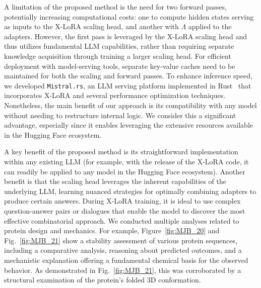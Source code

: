 A limitation of the proposed method is the need for two forward passes, potentially increasing computational costs: one to compute hidden states serving as inputs to the X-LoRA scaling head, and another with $\Lambda$ applied to the adapters. However, the first pass is leveraged by the X-LoRA scaling head and thus utilizes fundamental LLM capabilities, rather than requiring separate knowledge acquisition through training a larger scaling head. For efficient deployment with model-serving tools, separate key-value caches need to be maintained for both the scaling and forward passes. To enhance inference speed, we developed \texttt{Mistral.rs}, an LLM serving platform implemented in Rust~\cite{matsakis2014rust} that incorporates X-LoRA and several performance optimization techniques. Nonetheless, the main benefit of our approach is its compatibility with any model without needing to restructure internal logic. We consider this a significant advantage, especially since it enables leveraging the extensive resources available in the Hugging Face ecosystem.

A key benefit of the proposed method is its straightforward implementation within any existing LLM (for example, with the release of the X-LoRA code, it can readily be applied to any model in the Hugging Face ecosystem). Another benefit is that the scaling head leverages the inherent capabilities of the underlying LLM, learning nuanced strategies for optimally combining adapters to produce certain answers. During X-LoRA training, it is ideal to use complex question-answer pairs or dialogues that enable the model to discover the most effective combinatorial approach. We conducted multiple analyses related to protein design and mechanics. For example, Figure~\ref{fig:MJB_20} and Fig.~\ref{fig:MJB_21} show a stability assessment of various protein sequences, including a comparative analysis, reasoning about predicted outcomes, and a mechanistic explanation offering a fundamental chemical basis for the observed behavior. As demonstrated in Fig.~\ref{fig:MJB_21}, this was corroborated by a structural examination of the protein’s folded 3D conformation.

